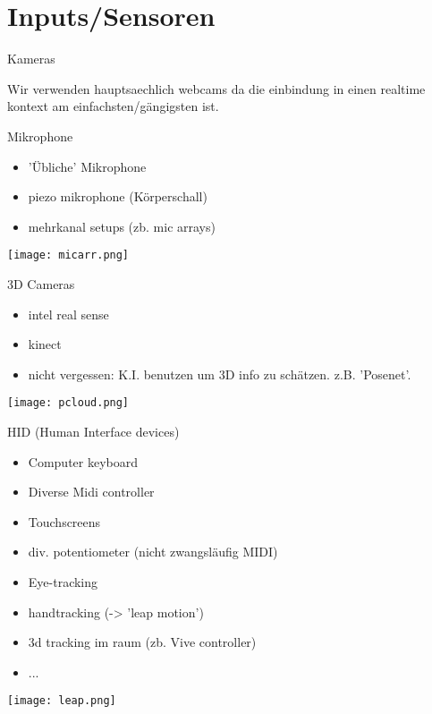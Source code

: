 \section{Inputs/Sensoren}
 \frame{\sectionpage}

\begin{frame}{Kameras}

Wir verwenden hauptsaechlich webcams da die einbindung in einen realtime kontext am einfachsten/gängigsten ist.

\end{frame}


\begin{frame}{Mikrophone}
\begin{itemize}
	\item 'Übliche' Mikrophone
	\item piezo mikrophone (Körperschall)
	\item mehrkanal setups (zb. mic arrays)
\end{itemize}
\texttt{[image: micarr.png]}

\end{frame}


\begin{frame}{3D Cameras}
\begin{itemize}
	\item intel real sense
	\item kinect
	\item nicht vergessen: K.I. benutzen um 3D info zu schätzen. z.B. 'Posenet'.
\end{itemize}
\texttt{[image: pcloud.png]}
\end{frame}

\begin{frame}{HID (Human Interface devices)}
	\begin{itemize}
		\item Computer keyboard 
		\item Diverse Midi controller
		\item Touchscreens
		\item div. potentiometer (nicht zwangsläufig MIDI)
		\item Eye-tracking
		\item handtracking (-> 'leap motion')
		\item 3d tracking im raum (zb. Vive controller)
		\item ...
	\end{itemize}
\texttt{[image: leap.png]}
\end{frame}


